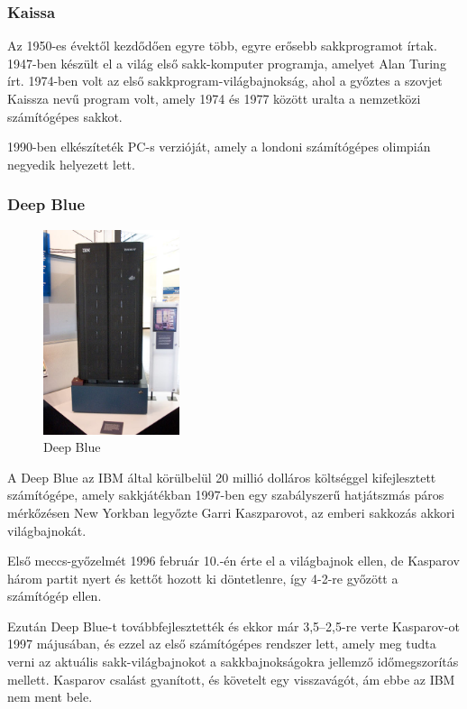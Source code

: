 \documentclass[twoside, a4paper, 12pt]{article}
\begin{document}
\subsubsection{Kaissa}
Az 1950-es évektől kezdődően egyre több, egyre erősebb sakkprogramot írtak. 1947-ben készült el a világ első sakk-komputer programja, amelyet Alan Turing írt. 1974-ben volt az első sakkprogram-világbajnokság, ahol a győztes a szovjet Kaissza nevű program volt, amely 1974 és 1977 között uralta a nemzetközi számítógépes sakkot.\cite{chessProgramsHu}

1990-ben elkészíteték PC-s verzióját, amely a londoni számítógépes olimpián negyedik helyezett lett.\cite{KaissaEn}

\subsubsection{Deep Blue}
\begin{figure}
	\caption{Deep Blue}
	\label{fig:deepblue}
	\includegraphics[width=4.0cm]{img/deepblue.jpg}
\end{figure}
A Deep Blue az IBM által körülbelül 20 millió dolláros költséggel kifejlesztett számítógépe, amely sakkjátékban 1997-ben egy szabályszerű hatjátszmás páros mérkőzésen New Yorkban legyőzte Garri Kaszparovot, az emberi sakkozás akkori világbajnokát.

Első meccs-győzelmét 1996 február 10.-én érte el a világbajnok ellen, de Kasparov három partit nyert és kettőt hozott ki döntetlenre, így 4-2-re győzött a számítógép ellen.

Ezután Deep Blue-t továbbfejlesztették és ekkor már 3,5–2,5-re verte Kasparov-ot 1997 májusában, és ezzel az első számítógépes rendszer lett, amely meg tudta verni az aktuális sakk-világbajnokot a sakkbajnokságokra jellemző időmegszorítás mellett. Kasparov csalást gyanított, és követelt egy visszavágót, ám ebbe az IBM nem ment bele. \cite{DeepBlueHu}\cite{DeepBlueEn}
\end{document}
